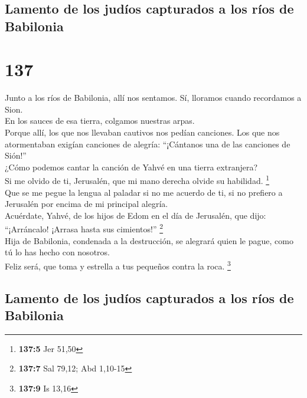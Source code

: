 \hypertarget{lamento-de-los-juduxedos-capturados-a-los-ruxedos-de-babilonia}{%
\subsection{Lamento de los judíos capturados a los ríos de
Babilonia}\label{lamento-de-los-juduxedos-capturados-a-los-ruxedos-de-babilonia}}

\hypertarget{section-134}{%
\section{137}\label{section-134}}

 Junto a los ríos de Babilonia, allí nos sentamos. Sí,
lloramos cuando recordamos a Sion.\\
 En los sauces de esa tierra, colgamos nuestras arpas.\\
 Porque allí, los que nos llevaban cautivos nos pedían
canciones. Los que nos atormentaban exigían canciones de alegría:
``¡Cántanos una de las canciones de Sión!''\\
 ¿Cómo podemos cantar la canción de Yahvé en una tierra
extranjera?\\
 Si me olvido de ti, Jerusalén, que mi mano derecha olvide
su habilidad. \footnote{\textbf{137:5} Jer 51,50}\\
 Que se me pegue la lengua al paladar si no me acuerdo de
ti, si no prefiero a Jerusalén por encima de mi principal alegría.\\
 Acuérdate, Yahvé, de los hijos de Edom en el día de
Jerusalén, que dijo: ``¡Arráncalo! ¡Arrasa hasta sus cimientos!''
\footnote{\textbf{137:7} Sal 79,12; Abd 1,10-15}\\
 Hija de Babilonia, condenada a la destrucción, se
alegrará quien le pague, como tú lo has hecho con nosotros.\\
 Feliz será, que toma y estrella a tus pequeños contra la
roca. \footnote{\textbf{137:9} Is 13,16}

\hypertarget{lamento-de-los-juduxedos-capturados-a-los-ruxedos-de-babilonia-1}{%
\subsection{Lamento de los judíos capturados a los ríos de
Babilonia}\label{lamento-de-los-juduxedos-capturados-a-los-ruxedos-de-babilonia-1}}

